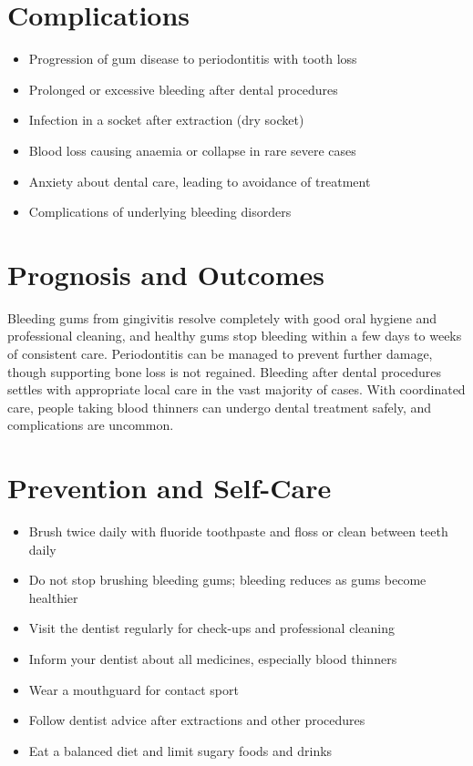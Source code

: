 \section*{Complications}
\begin{itemize}
    \item Progression of gum disease to periodontitis with tooth loss
    \item Prolonged or excessive bleeding after dental procedures
    \item Infection in a socket after extraction (dry socket)
    \item Blood loss causing anaemia or collapse in rare severe cases
    \item Anxiety about dental care, leading to avoidance of treatment
    \item Complications of underlying bleeding disorders
\end{itemize}

\section*{Prognosis and Outcomes}
Bleeding gums from gingivitis resolve completely with good oral hygiene and professional cleaning, and healthy gums stop bleeding within a few days to weeks of consistent care. Periodontitis can be managed to prevent further damage, though supporting bone loss is not regained. Bleeding after dental procedures settles with appropriate local care in the vast majority of cases. With coordinated care, people taking blood thinners can undergo dental treatment safely, and complications are uncommon.

\section*{Prevention and Self-Care}
\begin{itemize}
    \item Brush twice daily with fluoride toothpaste and floss or clean between teeth daily
    \item Do not stop brushing bleeding gums; bleeding reduces as gums become healthier
    \item Visit the dentist regularly for check-ups and professional cleaning
    \item Inform your dentist about all medicines, especially blood thinners
    \item Wear a mouthguard for contact sport
    \item Follow dentist advice after extractions and other procedures
    \item Eat a balanced diet and limit sugary foods and drinks
\end{itemize}

